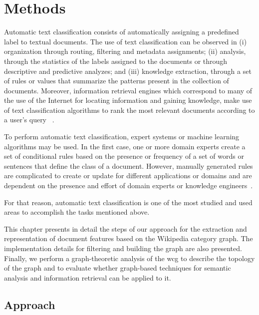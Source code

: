 \chapter{\hspace*{3pt} Methods}
\label{chapter:methodology}

Automatic text classification consists of automatically assigning a predefined label to textual documents. The use of text classification can be observed in (i) organization through routing, filtering and metadata assignments; (ii) analysis, through the statistics of the labels assigned to the documents or through descriptive and predictive analyzes; and (iii) knowledge extraction, through a set of rules or values that summarize the patterns present in the collection of documents. 
Moreover, information retrieval engines which correspond to many of the use of the Internet for locating information and gaining knowledge, make use of text classification algorithms to rank the most relevant documents according to a user's query ~\cite{Manning:2008}.

To perform automatic text classification, expert systems or machine learning algorithms may be used. In the first case, one or more domain experts create a set of conditional rules based on the presence or frequency of a set of words or sentences that define the class of a document. However, manually generated rules are complicated to create or update for different applications or domains and are dependent on the presence and effort of domain experts or knowledge engineers~\cite{Manning:2008}. 

For that reason, automatic text classification is one of the most studied and used areas to accomplish the tasks mentioned above. 

This chapter presents in detail the steps of our approach for the extraction and representation of document features based on the Wikipedia category graph. The implementation details for filtering and building the graph are also presented. Finally, we perform a graph-theoretic analysis of the \gls{wcg} to describe the topology of the graph and to evaluate whether graph-based techniques for semantic analysis and information retrieval can be applied to it.


\section{\hspace*{3pt} Approach} \label{sec:approach}

